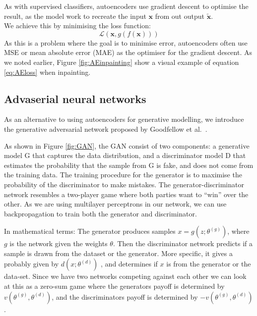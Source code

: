 As with supervised classifiers, autoencoders use gradient descent to optimise the result, as the model work to recreate the input $\textbf{x}$ from out output $\widetilde{\textbf{x}}$. \\    
We achieve this by minimising the loss function:\\
\begin{equation}
    \mathcal{L}(\textbf{x},g(f(\textbf{x})))
    \label{eq:AEloss}
\end{equation}
As this is a problem where the goal is to minimise error, autoencoders often use MSE or mean absolute error (MAE) as the optimiser for the gradient descent. 
As we noted earlier, Figure \ref{fig:AEinpainting} show a visual example of equation \ref{eq:AEloss} when inpainting.

    
\subsection{Advaserial neural networks}
\label{cha:Explaining_GANS}
As an alternative to using autoencoders for generative modelling, we introduce the generative adversarial network proposed by Goodfellow et al.~\cite{Goodfellow:2014:GAN:2969033.2969125}.

As shown in Figure \ref{fig:GAN}, the GAN consist of two components: a generative model G that captures the data distribution, and a discriminator model D that estimates the probability that the sample from G is fake, and does not come from the training data. The training procedure for the generator is to maximise the probability of the discriminator to make mistakes.
The generator-discriminator network resembles a two-player game where both parties want to ``win'' over the other.
As we are using multilayer perceptrons in our network, we can use backpropagation to train both the generator and discriminator. 

In mathematical terms:
The generator produces samples $x=g(z;\theta^{(g)})$, where $g$ is the network given the weights $\theta$. Then the discriminator network predicts if a sample is drawn from the dataset or the generator.
More specific, it gives a probably given by $d(x;\theta^{(d)})$ , and determines if $x$ is from the generator or the data-set. 
Since we have two networks competing against each other we can look at this as a zero-sum game where the generators payoff is determined by $v(\theta^{(g)},\theta^{(d)})$, and the discriminators payoff is determined by $-v(\theta^{(g)},\theta^{(d)})$.

